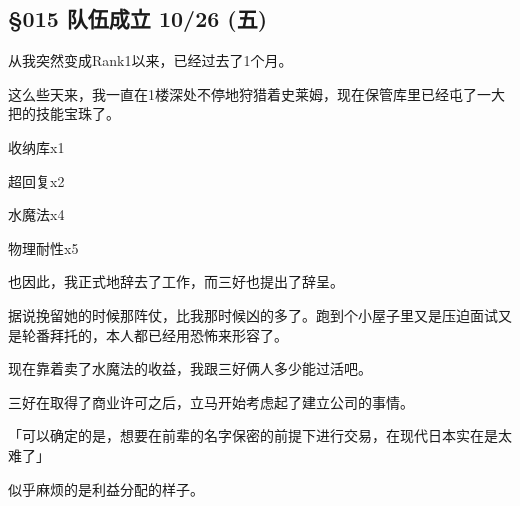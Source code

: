 \subsection{§015 队伍成立 10/26 (五)}

从我突然变成Rank1以来，已经过去了1个月。

这么些天来，我一直在1楼深处不停地狩猎着史莱姆，现在保管库里已经屯了一大把的技能宝珠了。

\cardline

	收纳库x1

	超回复x2

	水魔法x4

	物理耐性x5

\cardline

也因此，我正式地辞去了工作，而三好也提出了辞呈。

据说挽留她的时候那阵仗，比我那时候凶的多了。跑到个小屋子里又是压迫面试又是轮番拜托的，本人都已经用恐怖来形容了。

现在靠着卖了水魔法的收益，我跟三好俩人多少能过活吧。

三好在取得了商业许可之后，立马开始考虑起了建立公司的事情。

「可以确定的是，想要在前辈的名字保密的前提下进行交易，在现代日本实在是太难了」

似乎麻烦的是利益分配的样子。

